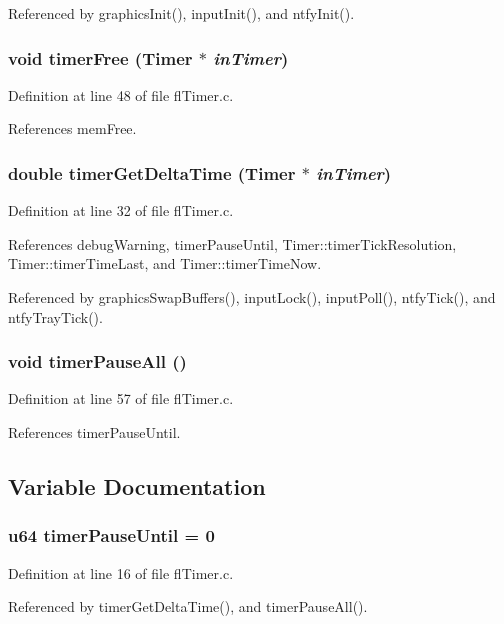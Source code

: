 Referenced by graphics\-Init(), input\-Init(), and ntfy\-Init().
\subsubsection{\setlength{\rightskip}{0pt plus 5cm}void timer\-Free ({\bf Timer} $\ast$ {\em in\-Timer})}\label{flTimer_8c_725e9715b3a290861aab8af7146aa2b3}




Definition at line 48 of file fl\-Timer.c.

References mem\-Free.
\subsubsection{\setlength{\rightskip}{0pt plus 5cm}double timer\-Get\-Delta\-Time ({\bf Timer} $\ast$ {\em in\-Timer})}\label{flTimer_8c_154b34b0d32a2c77e90dc904a634fd59}




Definition at line 32 of file fl\-Timer.c.

References debug\-Warning, timer\-Pause\-Until, Timer::timer\-Tick\-Resolution, Timer::timer\-Time\-Last, and Timer::timer\-Time\-Now.

Referenced by graphics\-Swap\-Buffers(), input\-Lock(), input\-Poll(), ntfy\-Tick(), and ntfy\-Tray\-Tick().
\subsubsection{\setlength{\rightskip}{0pt plus 5cm}void timer\-Pause\-All ()}\label{flTimer_8c_944af842e6771f6d921f56381ec457ea}




Definition at line 57 of file fl\-Timer.c.

References timer\-Pause\-Until.

\subsection{Variable Documentation}
\subsubsection{\setlength{\rightskip}{0pt plus 5cm}u64 {\bf timer\-Pause\-Until} = 0}\label{flTimer_8c_fa057cd91ce37941ba5ece66cf1e7ecc}




Definition at line 16 of file fl\-Timer.c.

Referenced by timer\-Get\-Delta\-Time(), and timer\-Pause\-All().